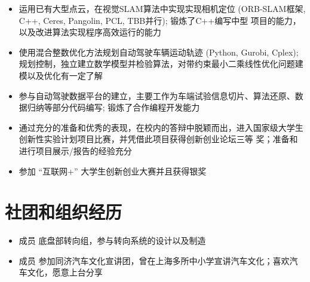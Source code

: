 \documentclass{resume}
\begin{document}
\begin{itemize}
  \item 运用已有大型点云，在视觉SLAM算法中实现实现相机定位 (ORB-SLAM框架, C++, Ceres, Pangolin, PCL, TBB并行); 锻炼了C++编写中型
  项目的能力，以及改进算法实现程序高效运行的能力
\end{itemize}


\begin{itemize}
	\item 使用混合整数优化方法规划自动驾驶车辆运动轨迹 (Python, Gurobi, Cplex); 规划控制，独立建立数学模型并检验算法，对带约束最小二乘线性优化问题建模以及优化有一定了解
\end{itemize}

\begin{itemize}
	\item 参与自动驾驶数据平台的建立，主要工作为车端试验信息切片、算法还原、数据归纳等部分代码编写; 锻炼了合作编程开发能力
\end{itemize}

\begin{itemize}
	\item 通过充分的准备和优秀的表现，在校内的答辩中脱颖而出，进入国家级大学生创新性实验计划项目比赛，并凭借此项目获得创新创业论坛三等
	奖；准备和进行项目展示/报告的经验充分
	\item 参加 “互联网+” 大学生创新创业大赛并且获得银奖
\end{itemize}


\section{社团和组织经历}
\begin{itemize}
	\item 成员 底盘部转向组，参与转向系统的设计以及制造
\end{itemize}
\begin{itemize}
	\item 成员 参加同济汽车文化宣讲团，曾在上海多所中小学宣讲汽车文化；喜欢汽车文化，愿意上台分享
\end{itemize}
\end{document}
